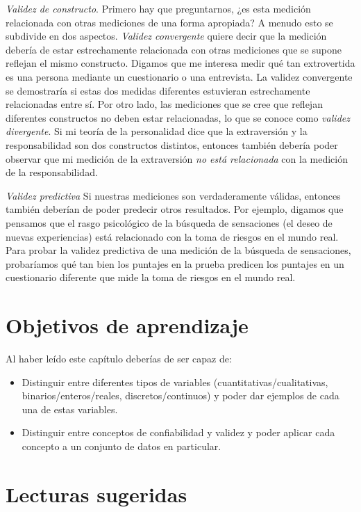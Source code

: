 \documentclass[
  12pt,
]{book}
\providecommand{\tightlist}{%
  \setlength{\itemsep}{0pt}\setlength{\parskip}{0pt}}
\theoremstyle{definition}
\theoremstyle{definition}
\theoremstyle{definition}
\theoremstyle{remark}
\begin{document}
\emph{Validez de constructo}. Primero hay que preguntarnos, ¿es esta medición relacionada con otras mediciones de una forma apropiada? A menudo esto se subdivide en dos aspectos. \emph{Validez convergente} quiere decir que la medición debería de estar estrechamente relacionada con otras mediciones que se supone reflejan el mismo constructo. Digamos que me interesa medir qué tan extrovertida es una persona mediante un cuestionario o una entrevista. La validez convergente se demostraría si estas dos medidas diferentes estuvieran estrechamente relacionadas entre sí. Por otro lado, las mediciones que se cree que reflejan diferentes constructos no deben estar relacionadas, lo que se conoce como \emph{validez divergente}. Si mi teoría de la personalidad dice que la extraversión y la responsabilidad son dos constructos distintos, entonces también debería poder observar que mi medición de la extraversión \emph{no está relacionada} con la medición de la responsabilidad.

\emph{Validez predictiva} Si nuestras mediciones son verdaderamente válidas, entonces también deberían de poder predecir otros resultados. Por ejemplo, digamos que pensamos que el rasgo psicológico de la búsqueda de sensaciones (el deseo de nuevas experiencias) está relacionado con la toma de riesgos en el mundo real. Para probar la validez predictiva de una medición de la búsqueda de sensaciones, probaríamos qué tan bien los puntajes en la prueba predicen los puntajes en un cuestionario diferente que mide la toma de riesgos en el mundo real.

\hypertarget{objetivos-de-aprendizaje}{%
\section{Objetivos de aprendizaje}\label{objetivos-de-aprendizaje}}

Al haber leído este capítulo deberías de ser capaz de:

\begin{itemize}
\tightlist
\item
  Distinguir entre diferentes tipos de variables (cuantitativas/cualitativas, binarios/enteros/reales, discretos/continuos) y poder dar ejemplos de cada una de estas variables.
\item
  Distinguir entre conceptos de confiabilidad y validez y poder aplicar cada concepto a un conjunto de datos en particular.
\end{itemize}

\hypertarget{lecturas-sugeridas}{%
\section{Lecturas sugeridas}\label{lecturas-sugeridas}}
\end{document}
